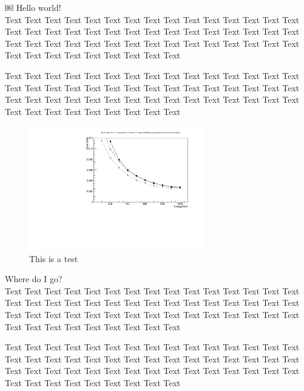 \documentclass[a4paper,11pt, onecolumn]{article}
\begin{document}
￼
Hello world! \\

Text Text Text Text Text Text Text Text Text Text Text Text Text Text Text Text Text Text Text Text Text Text Text Text Text Text Text
Text Text Text Text Text Text Text Text Text Text Text Text Text Text Text Text Text Text Text Text Text Text Text Text Text Text Text

Text Text Text Text Text Text Text Text Text Text Text Text Text Text Text Text Text Text Text Text Text Text Text Text Text Text Text
Text Text Text Text Text Text Text Text Text Text Text Text Text Text Text Text Text Text Text Text Text Text Text Text Text Text Text \\


\begin{figure}
  \begin{center}
  \includegraphics[width = 0.68\textwidth]{trial_pdf}
  \caption{This is a test}
  \end{center}
\end{figure}

Where do I go? \\

Text Text Text Text Text Text Text Text Text Text Text Text Text Text Text Text Text Text Text Text Text Text Text Text Text Text Text
Text Text Text Text Text Text Text Text Text Text Text Text Text Text Text Text Text Text Text Text Text Text Text Text Text Text Text

Text Text Text Text Text Text Text Text Text Text Text Text Text Text Text Text Text Text Text Text Text Text Text Text Text Text Text
Text Text Text Text Text Text Text Text Text Text Text Text Text Text Text Text Text Text Text Text Text Text Text Text Text Text Text
\end{document}
